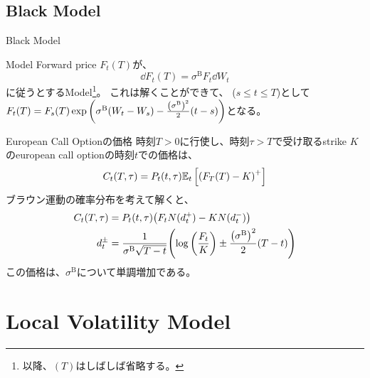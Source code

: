 \documentclass[dvipdfmx,9pt]{beamer}
\begin{document}
\subsection{Black Model}
\begin{frame}{Black Model}
  \begin{block}{Model}
    Forward price $F_{t}(T)$が、
    \begin{equation}
      \dd F_{t}(T) = \sigma^{\mathrm{B}} F_{t}\dd W_{t}
    \end{equation}
    に従うとするModel\footnote{以降、$(T)$はしばしば省略する。}。
    これは解くことができて、 ($s \leq t\leq T$)として$F_{t}(T) = F_{s}(T)\expi{\sigma^{\mathrm{B}}(W_{t} - W_{s})-\frac{\pqty{\sigma^{\mathrm{B}}}^{2}}{2}(t-s)}$となる。
  \end{block}
  \begin{block}{European Call Optionの価格}
    時刻$T>0$に行使し、時刻$\tau >T$で受け取るstrike $K$のeuropean call optionの時刻$t$での価格は、
    \begin{equation}
      C_{t}(T,\tau) = P_{t}(t,\tau)\exv[t]{\pqty{F_{T}(T) - K}^{+}}
    \end{equation}
    ブラウン運動の確率分布を考えて解くと、
    \begin{align}
      C_{t}(T,\tau) & = P_{t}(t,\tau) \pqty{F_{t} N(d_{t}^{+}) - KN(d_{t}^{-})}                                                                  \\
      d_{t}^{\pm}   & = \frac{1}{\sigma^{\mathrm{B}}\sqrt{T-t}}\pqty{\log\pqty{\frac{F_{t}}{K}}\pm\frac{\pqty{\sigma^{\mathrm{B}}}^{2}}{2}(T-t)}
    \end{align}
    この価格は、$\sigma^{\mathrm{B}}$について単調増加である。
  \end{block}
\end{frame}

\section{Local Volatility Model}
\end{document}
